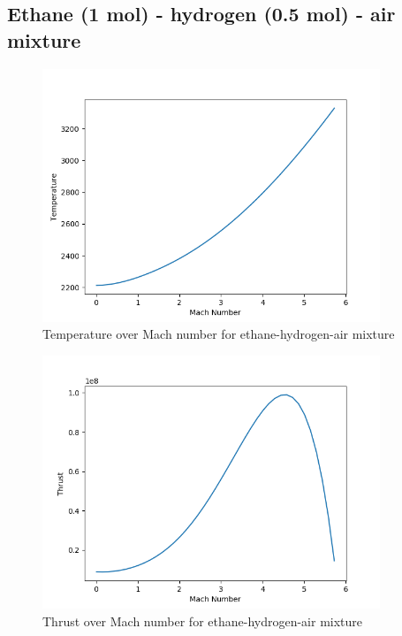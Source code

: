 \documentclass[a4paper,11pt]{article}
\begin{document}
\subsection{Ethane (1 mol) - hydrogen (0.5 mol) - air mixture}
	\begin{figure}[H]
		\centering
       		\includegraphics[width=0.9\textwidth]{Wodor(0.5mol)_Etan(1mol)_pow/Temperature_over_Mach.png}
       		\caption{Temperature over Mach number for ethane-hydrogen-air mixture}
	\end{figure}
	\begin{figure}[H]
		\centering
		\includegraphics[width=0.9\textwidth]{Wodor(0.5mol)_Etan(1mol)_pow/Thrust_over_Mach.png}
       		\caption{Thrust over Mach number for ethane-hydrogen-air mixture}
	\end{figure}
\end{document}

